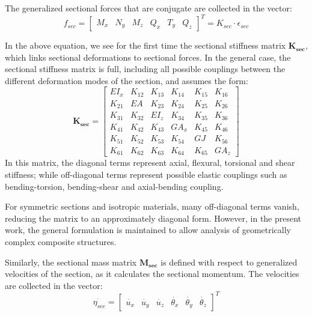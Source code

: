 The generalized sectional forces that are conjugate are collected in the vector:
\begin{equation}
    f_{sec} =     
    \begin{bmatrix}
        M_{x} & N_{y} & M_{z} & Q_{x} & T_{y} & Q_{z}
    \end{bmatrix}^T = K_{sec} \cdot \epsilon_{sec}
    \label{eq:sectional_forces}
\end{equation}

In the above equation, we see for the first time the sectional stiffness matrix $\mathbf{K_{sec}}$, which links sectional deformations to sectional forces.
In the general case, the sectional stiffness matrix is full, including all possible couplings between the different deformation modes of the section, and assumes the form:
\begin{equation}
    \mathbf{K_{sec}} =
    \begin{bmatrix}
    EI_{x} & K_{12} & K_{13} & K_{14} & K_{15} & K_{16} \\
    K_{21} & EA     & K_{23} & K_{24} & K_{25} & K_{26} \\
    K_{31} & K_{32} & EI_{z} & K_{34} & K_{35} & K_{36} \\
    K_{41} & K_{42} & K_{43} & GA_{x} & K_{45} & K_{46} \\
    K_{51} & K_{52} & K_{53} & K_{54} & GJ     & K_{56} \\
    K_{61} & K_{62} & K_{63} & K_{64} & K_{65} & GA_{z}
    \end{bmatrix}
    \label{eq:section_stiffness_matrix}
\end{equation}
In this matrix, the diagonal terms represent axial, flexural, torsional and shear stiffness; while off-diagonal terms represent possible elastic couplings
such as bending-torsion, bending-shear and axial-bending coupling.

For symmetric sections and isotropic materials, many off-diagonal terms vanish, reducing the matrix to an approximately diagonal form. However, in the present work, 
the general formulation is maintained to allow analysis of geometrically complex composite structures.

Similarly, the sectional mass matrix $\mathbf{M_{sec}}$ is defined with respect to generalized velocities of the section, as it calculates the sectional momentum.
The velocities are collected in the vector:
\begin{equation}
    \dot{{\eta}_{sec}} =
    \begin{bmatrix}
        \dot{u_{x}} & \dot{u_{y}} & \dot{u_{z}} & \dot{\theta_{x}} & \dot{\theta_{y}} & \dot{\theta_{z}}
    \end{bmatrix}^T
    \label{eq:sectional_velocities}
\end{equation}

